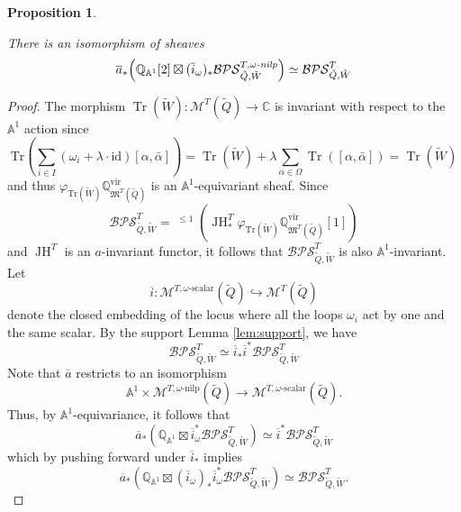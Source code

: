 \documentclass{amsart}
\newtheorem{proposition}[theorem]{Proposition}
\DeclareMathOperator{\Tr}{\mathrm{Tr}}
\def\vir{\mathrm{vir}}
\DeclareMathOperator{\ptau}{{}^{\mathfrak{p}}\tau}
\DeclareMathOperator{\JH}{\mathrm{JH}}
\def\oi{\overline{i}}
\def\edge{\Omega}
\def\dalpha{\bar{\alpha}}
\def\tW{\tilde{W}}
\begin{document}
\medskip 

\begin{proposition} 
\label{eqn:sheafrelation}
    
There is an isomorphism of sheaves 
\begin{equation} 
\label{eqn:isosheaves}
\overline{a}_{*} \Big( \mathbb{Q}_{\mathbb{A}^1}[2] \boxtimes (\overline{i}_{\omega})_{*}\mathcal{BPS}^{T,\omega\emph{-nilp}}_{\tilde{Q},\tilde{W}} \Big) \simeq \mathcal{BPS}^{T}_{\tilde{Q},\tilde{W}}
\end{equation}
\end{proposition}

\medskip 

\begin{proof} The morphism $\Tr(\tW): \mathcal{M}^T(\tilde{Q}) \rightarrow \mathbb{C}$ is invariant with respect to the $\mathbb{A}^1$ action since 
\[ 
\mathrm{Tr}\left( \sum_{i \in I} (\omega_i + \lambda \cdot \text{id})[\alpha,\dalpha] \right) = \Tr(\tilde{W})+ \lambda \sum_{\alpha \in \edge} \Tr([\alpha,\dalpha]) = \Tr(\tilde{W}) 
\] 
and thus $\varphi_{\mathrm{Tr}(\tilde{W})}\mathbb{Q}^{\vir}_{\mathfrak{M}^T(\tilde{Q})}$ is an $\mathbb{A}^1$-equivariant sheaf. Since 
$$
\mathcal{BPS}^T_{\tilde{Q},\tilde{W}} = \ptau^{\leq 1}(\JH^T_*\varphi_{\mathrm{Tr}(\tilde{W})}\mathbb{Q}^{\vir}_{\mathfrak{M}^T(\tilde{Q})}[1])
$$
and $\JH^T$ is an $a$-invariant functor, it follows that $\mathcal{BPS}^T_{\tilde{Q},\tilde{W}}$ is also $\mathbb{A}^1$-invariant. Let 
$$
\overline{i} : \mathcal{M}^{T,\omega\text{-scalar}}(\tilde{Q}) \hookrightarrow \mathcal{M}^T(\tilde{Q})
$$
denote the closed embedding of the locus where all the loops $\omega_i$ act by one and the same scalar. By the support Lemma \ref{lem:support}, we have
\[ 
\mathcal{BPS}^T_{\tilde{Q},\tilde{W}} \simeq \overline{i}_*\overline{i}^* \mathcal{BPS}^T_{\tilde{Q},\tilde{W}}
\]
Note that $\overline{a}$ restricts to an isomorphism 
\[ 
\mathbb{A}^1 \times \mathcal{M}^{T,\omega\text{-nilp}}(\tilde{Q}) \rightarrow \mathcal{M}^{T, \omega\text{-scalar}}(\tilde{Q}).
\] 
Thus, by $\mathbb{A}^1$-equivariance, it follows that
\[ 
\overline{a}_{*}(\mathbb{Q}_{\mathbb{A}^1} \boxtimes \oi_{\omega}^* \mathcal{BPS}^T_{\tilde{Q},\tilde{W}}) \simeq \overline{i}^*\mathcal{BPS}^T_{\tilde{Q},\tilde{W}}
\] 
which by pushing forward under $\overline{i}_{*}$ implies
\begin{equation} \label{eqn:dualstatement}
\overline{a}_{*}( \mathbb{Q}_{\mathbb{A}^1} \boxtimes (\oi_{\omega})_{*}\oi_{\omega}^*\mathcal{BPS}^T_{\tilde{Q},\tilde{W}}) \simeq \mathcal{BPS}^{T}_{\tilde{Q},\tilde{W}}.   

\end{equation}
\end{proof}
\end{document}
